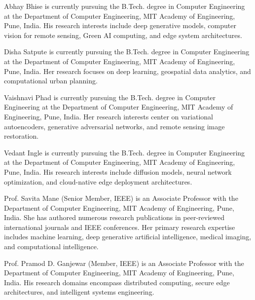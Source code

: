 \documentclass[journal]{IEEEtran}
\begin{document}
\begin{IEEEbiographynophoto}{Abhay Bhise}
is currently pursuing the B.Tech. degree in Computer Engineering at the Department of Computer Engineering, MIT Academy of Engineering, Pune, India. His research interests include deep generative models, computer vision for remote sensing, Green AI computing, and edge system architectures.
\end{IEEEbiographynophoto}

\begin{IEEEbiographynophoto}{Disha Satpute}
is currently pursuing the B.Tech. degree in Computer Engineering at the Department of Computer Engineering, MIT Academy of Engineering, Pune, India. Her research focuses on deep learning, geospatial data analytics, and computational urban planning.
\end{IEEEbiographynophoto}

\begin{IEEEbiographynophoto}{Vaishnavi Phad}
is currently pursuing the B.Tech. degree in Computer Engineering at the Department of Computer Engineering, MIT Academy of Engineering, Pune, India. Her research interests center on variational autoencoders, generative adversarial networks, and remote sensing image restoration.
\end{IEEEbiographynophoto}

\begin{IEEEbiographynophoto}{Vedant Ingle}
is currently pursuing the B.Tech. degree in Computer Engineering at the Department of Computer Engineering, MIT Academy of Engineering, Pune, India. His research interests include diffusion models, neural network optimization, and cloud-native edge deployment architectures.
\end{IEEEbiographynophoto}

\begin{IEEEbiographynophoto}{Prof. Savita Mane}
(Senior Member, IEEE) is an Associate Professor with the Department of Computer Engineering, MIT Academy of Engineering, Pune, India. She has authored numerous research publications in peer-reviewed international journals and IEEE conferences. Her primary research expertise includes machine learning, deep generative artificial intelligence, medical imaging, and computational intelligence.
\end{IEEEbiographynophoto}

\begin{IEEEbiographynophoto}{Prof. Pramod D. Ganjewar}
(Member, IEEE) is an Associate Professor with the Department of Computer Engineering, MIT Academy of Engineering, Pune, India. His research domains encompass distributed computing, secure edge architectures, and intelligent systems engineering.
\end{IEEEbiographynophoto}
\end{document}
